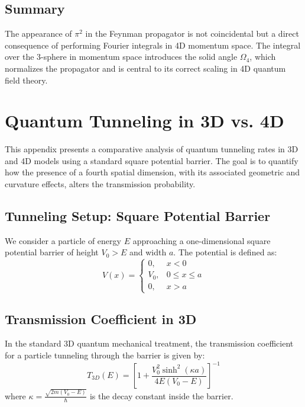\documentclass[12pt,a4paper]{article}
\begin{document}
\subsection{Summary}

The appearance of \(\pi^2\) in the Feynman propagator is not coincidental but a direct consequence of performing Fourier integrals in 4D momentum space. The integral over the 3-sphere in momentum space introduces the solid angle \(\Omega_4\), which normalizes the propagator and is central to its correct scaling in 4D quantum field theory.


\section{Quantum Tunneling in 3D vs. 4D}
\label{app:tunneling}

This appendix presents a comparative analysis of quantum tunneling rates in 3D and 4D models using a standard square potential barrier. The goal is to quantify how the presence of a fourth spatial dimension, with its associated geometric and curvature effects, alters the transmission probability.

\subsection{Tunneling Setup: Square Potential Barrier}

We consider a particle of energy \(E\) approaching a one-dimensional square potential barrier of height \(V_0 > E\) and width \(a\). The potential is defined as:
\begin{equation}
V(x) = 
\begin{cases}
0, & x < 0 \\
V_0, & 0 \leq x \leq a \\
0, & x > a
\end{cases}
\end{equation}

\subsection{Transmission Coefficient in 3D}

In the standard 3D quantum mechanical treatment, the transmission coefficient for a particle tunneling through the barrier is given by:
\begin{equation}
T_{3D}(E) = \left[ 1 + \frac{V_0^2 \sinh^2(\kappa a)}{4E(V_0 - E)} \right]^{-1}
\end{equation}
where \(\kappa = \frac{\sqrt{2m(V_0 - E)}}{\hbar}\) is the decay constant inside the barrier.
\end{document}

